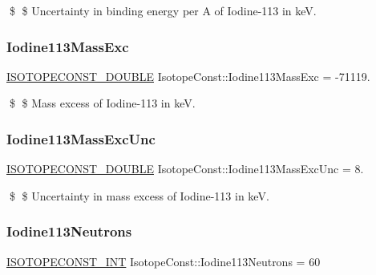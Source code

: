 \$ \$ Uncertainty in binding energy per A of Iodine-\/113 in keV. \mbox{\label{group___isotope_const-_iodine-_i113_ga4b85299b3263309ae9ae7682f3e3ac81}} 
\subsubsection{\texorpdfstring{Iodine113\+Mass\+Exc}{Iodine113MassExc}}
{\footnotesize\ttfamily \mbox{\hyperlink{group___isotope_const-_macros_ga8f45a7272ce02c0b4c65c44636ed719a}{I\+S\+O\+T\+O\+P\+E\+C\+O\+N\+S\+T\+\_\+\+D\+O\+U\+B\+LE}} Isotope\+Const\+::\+Iodine113\+Mass\+Exc = -\/71119.}

\$ \$ Mass excess of Iodine-\/113 in keV. \mbox{\label{group___isotope_const-_iodine-_i113_gad337bab7e93a2af64ae084bfef52e61c}} 
\subsubsection{\texorpdfstring{Iodine113\+Mass\+Exc\+Unc}{Iodine113MassExcUnc}}
{\footnotesize\ttfamily \mbox{\hyperlink{group___isotope_const-_macros_ga8f45a7272ce02c0b4c65c44636ed719a}{I\+S\+O\+T\+O\+P\+E\+C\+O\+N\+S\+T\+\_\+\+D\+O\+U\+B\+LE}} Isotope\+Const\+::\+Iodine113\+Mass\+Exc\+Unc = 8.}

\$ \$ Uncertainty in mass excess of Iodine-\/113 in keV. \mbox{\label{group___isotope_const-_iodine-_i113_gafbabf92087f1fa5742be83c857ed204f}} 
\subsubsection{\texorpdfstring{Iodine113\+Neutrons}{Iodine113Neutrons}}
{\footnotesize\ttfamily \mbox{\hyperlink{group___isotope_const-_macros_ga5f18360b3e99483a35c32d789e62621c}{I\+S\+O\+T\+O\+P\+E\+C\+O\+N\+S\+T\+\_\+\+I\+NT}} Isotope\+Const\+::\+Iodine113\+Neutrons = 60}

